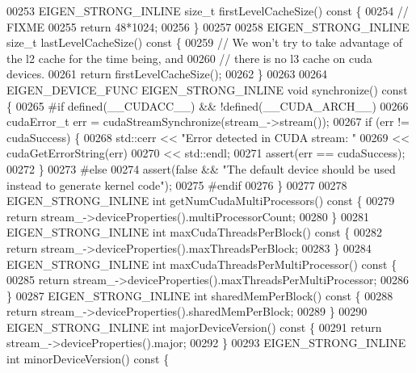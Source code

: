 \begin{DoxyCode}
00253   EIGEN\_STRONG\_INLINE \textcolor{keywordtype}{size\_t} firstLevelCacheSize()\textcolor{keyword}{ const }\{
00254     \textcolor{comment}{// FIXME}
00255     \textcolor{keywordflow}{return} 48*1024;
00256   \}
00257 
00258   EIGEN\_STRONG\_INLINE \textcolor{keywordtype}{size\_t} lastLevelCacheSize()\textcolor{keyword}{ const }\{
00259     \textcolor{comment}{// We won't try to take advantage of the l2 cache for the time being, and}
00260     \textcolor{comment}{// there is no l3 cache on cuda devices.}
00261     \textcolor{keywordflow}{return} firstLevelCacheSize();
00262   \}
00263 
00264   EIGEN\_DEVICE\_FUNC EIGEN\_STRONG\_INLINE \textcolor{keywordtype}{void} synchronize()\textcolor{keyword}{ const }\{
00265 \textcolor{preprocessor}{#if defined(\_\_CUDACC\_\_) && !defined(\_\_CUDA\_ARCH\_\_)}
00266     cudaError\_t err = cudaStreamSynchronize(stream\_->stream());
00267     \textcolor{keywordflow}{if} (err != cudaSuccess) \{
00268       std::cerr << \textcolor{stringliteral}{"Error detected in CUDA stream: "}
00269                 << cudaGetErrorString(err)
00270                 << std::endl;
00271       assert(err == cudaSuccess);
00272     \}
00273 \textcolor{preprocessor}{#else}
00274     assert(\textcolor{keyword}{false} && \textcolor{stringliteral}{"The default device should be used instead to generate kernel code"});
00275 \textcolor{preprocessor}{#endif}
00276   \}
00277 
00278   EIGEN\_STRONG\_INLINE \textcolor{keywordtype}{int} getNumCudaMultiProcessors()\textcolor{keyword}{ const }\{
00279     \textcolor{keywordflow}{return} stream\_->deviceProperties().multiProcessorCount;
00280   \}
00281   EIGEN\_STRONG\_INLINE \textcolor{keywordtype}{int} maxCudaThreadsPerBlock()\textcolor{keyword}{ const }\{
00282     \textcolor{keywordflow}{return} stream\_->deviceProperties().maxThreadsPerBlock;
00283   \}
00284   EIGEN\_STRONG\_INLINE \textcolor{keywordtype}{int} maxCudaThreadsPerMultiProcessor()\textcolor{keyword}{ const }\{
00285     \textcolor{keywordflow}{return} stream\_->deviceProperties().maxThreadsPerMultiProcessor;
00286   \}
00287   EIGEN\_STRONG\_INLINE \textcolor{keywordtype}{int} sharedMemPerBlock()\textcolor{keyword}{ const }\{
00288     \textcolor{keywordflow}{return} stream\_->deviceProperties().sharedMemPerBlock;
00289   \}
00290   EIGEN\_STRONG\_INLINE \textcolor{keywordtype}{int} majorDeviceVersion()\textcolor{keyword}{ const }\{
00291     \textcolor{keywordflow}{return} stream\_->deviceProperties().major;
00292   \}
00293   EIGEN\_STRONG\_INLINE \textcolor{keywordtype}{int} minorDeviceVersion()\textcolor{keyword}{ const }\{

\end{DoxyCode}
